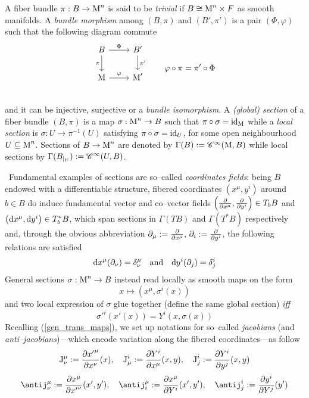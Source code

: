 \begin{defi}
    A fiber bundle $\pi:B\to\text{\normalfont M}^n$ is said to be \emph{trivial} if $B\cong\text{\normalfont M}^n\times F$ as smooth manifolds. A \emph{bundle morphism} among $(B,\pi)$ and $(B',\pi')$ is a pair $(\Phi,\varphi)$ such that the following diagram commute\[\begin{tikzcd}
B \arrow{r}{\Phi} \arrow[swap]{d}{\pi} & B' \arrow{d}{\pi'} \\
\M \arrow{r}{\varphi} & \M' \\
\end{tikzcd} \qquad\varphi\circ\pi=\pi'\circ\Phi
\] and it can be injective, surjective or a \emph{bundle isomorphism}. A \emph{(global) section} of a fiber bundle $(B,\pi)$ is a map $\sigma:\text{\normalfont M}^n\to B$ such that $\pi\circ\sigma=\text{\normalfont id}_{\text{\normalfont M}}$ while a \emph{local section} is $\sigma:U\to\pi^{-1}(U)$ satisfying $\pi\circ\sigma=\text{\normalfont id}_U$, for some open neighbourhood $U\subseteq\text{\normalfont M}^n$. Sections of $B\to\text{\normalfont M}^n$ are denoted by $\Gamma(B):=\mathscr{C}^\infty(\text{\normalfont M},B)$ while local sections by $\Gamma(B_{|_U}):=\mathscr{C}^\infty(U,B)$.
\end{defi}
\,\newline
Fundamental examples of sections are so--called \emph{coordinates fields}: being $B$ endowed with a differentiable structure, fibered coordinates $(x^\mu,y^i)$ around $b\in B$ do induce fundamental vector and co--vector fields $\left(\frac{\partial}{\partial x^\mu},\frac{\partial}{\partial y^i}\right)\in T_bB$ and $\left(\text{\normalfont d} x^\mu,\text{\normalfont d} y^i\right)\in T^*_bB$, which span sections in $\Gamma(TB)$ and $\Gamma(T^*B)$ respectively and, through the obvious abbreviation $\partial_\mu:=\frac{\partial}{\partial x^\mu},\,\partial_i:=\frac{\partial}{\partial y^i}$, the following relations are satisfied
$$\text{\normalfont d} x^\mu(\partial_\nu)=\delta^\mu_\nu\quad\text{and}\quad\text{\normalfont d} y^i(\partial_j)=\delta^i_j$$
General sections $\sigma:\text{\normalfont M}^n\to B$ instead read locally as smooth maps on the form
$$x\mapsto\left(x^\mu,\sigma^i(x)\right)$$
and two local expression of $\sigma$ glue together (define the same global section) \emph{iff}
\begin{equation}\label{sections}
    {\sigma'}^i(x'(x))=Y^i(x,\sigma(x))
\end{equation}
Recalling (\ref{gen_trans_maps}), we set up notations for so--called \emph{jacobians} (and \emph{anti--jacobians})---which encode variation along the fibered coordinates---as follow
$$\text{\normalfont J}^\mu_\nu:=\frac{\partial{x'}^\mu}{\partial x^\nu}(x),\quad\text{\normalfont J}^i_\mu:=\frac{\partial Y^i}{\partial x^\mu}(x,y),\quad\text{\normalfont J}^i_j:=\frac{\partial Y^i}{\partial y^j}(x,y)$$
$$\antij^\mu_\nu:=\frac{\der x^\mu}{\der{x'}^\nu}(x',y'),\quad\antij^\mu_i:=\frac{\der x^\mu}{\der Y^i}(x',y'),\quad\antij^i_j:=\frac{\der y^i}{\der Y^j}(y')$$

